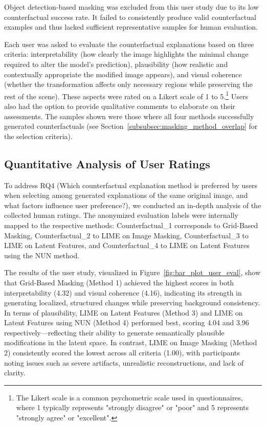 Object detection-based masking was excluded from this user study due to its low counterfactual success rate. It failed to consistently produce valid counterfactual examples and thus lacked sufficient representative samples for human evaluation.

Each user was asked to evaluate the counterfactual explanations based on three criteria: interpretability (how clearly the image highlights the minimal change required to alter the model’s prediction), plausibility (how realistic and contextually appropriate the modified image appears), and visual coherence (whether the transformation affects only necessary regions while preserving the rest of the scene). These aspects were rated on a Likert scale of 1 to 5.\footnote{The Likert scale is a common psychometric scale used in questionnaires, where 1 typically represents "strongly disagree" or "poor" and 5 represents "strongly agree" or "excellent".} Users also had the option to provide qualitative comments to elaborate on their assessments. The samples shown were those where all four methods successfully generated counterfactuals (see Section~\ref{subsubsec:masking_method_overlap} for the selection criteria).

\subsection{Quantitative Analysis of User Ratings} \label{subsubsec:quantitative_analysis_of_user_ratings}

To address RQ4 (Which counterfactual explanation method is preferred by users when selecting among generated explanations of the same original image, and what factors influence user preference?), we conducted an in-depth analysis of the collected human ratings. The anonymized evaluation labels were internally mapped to the respective methods: Counterfactual\_1 corresponds to Grid-Based Masking, Counterfactual\_2 to LIME on Image Masking, Counterfactual\_3 to LIME on Latent Features, and Counterfactual\_4 to LIME on Latent Features using the NUN method.

The results of the user study, visualized in Figure~\ref{fig:bar_plot_user_eval}, show that Grid-Based Masking (Method 1) achieved the highest scores in both interpretability (4.32) and visual coherence (4.16), indicating its strength in generating localized, structured changes while preserving background consistency. In terms of plausibility, LIME on Latent Features (Method 3) and LIME on Latent Features using NUN (Method 4) performed best, scoring 4.04 and 3.96 respectively—reflecting their ability to generate semantically plausible modifications in the latent space. In contrast, LIME on Image Masking (Method 2) consistently scored the lowest across all criteria (1.00), with participants noting issues such as severe artifacts, unrealistic reconstructions, and lack of clarity.

